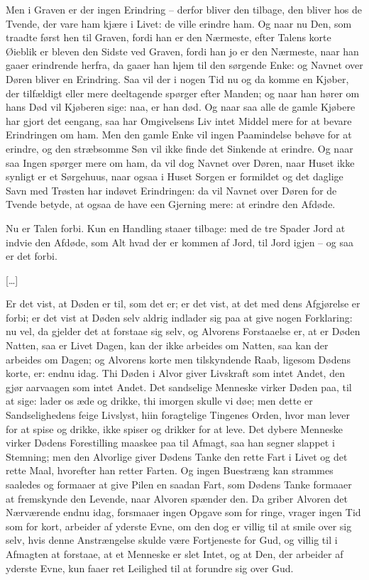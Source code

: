 \documentclass[12pt,a4paper]{article}
\begin{document}
Men i Graven er der ingen Erindring – derfor bliver den tilbage, den bliver hos de Tvende, der vare ham kjære i Livet: de ville erindre ham. Og naar nu Den, som traadte først hen til Graven, fordi han er den Nærmeste, efter Talens korte Øieblik er bleven den Sidste ved Graven, fordi han jo er den Nærmeste, naar han gaaer erindrende herfra, da gaaer han hjem til den sørgende Enke: og Navnet over Døren bliver en Erindring. Saa vil der i nogen Tid nu og da komme en Kjøber, der tilfældigt eller mere deeltagende spørger efter Manden; og naar han hører om hans Død vil Kjøberen sige: naa, er han død. Og naar saa alle de gamle Kjøbere har gjort det eengang, saa har Omgivelsens Liv intet Middel mere for at bevare Erindringen om ham. Men den gamle Enke vil ingen Paamindelse behøve for at erindre, og den stræbsomme Søn vil ikke finde det Sinkende at erindre. Og naar saa Ingen spørger mere om ham, da vil dog Navnet over Døren, naar Huset ikke synligt er et Sørgehuus, naar ogsaa i Huset Sorgen er formildet og det daglige Savn med Trøsten har indøvet Erindringen: da vil Navnet over Døren for de Tvende betyde, at ogsaa de have een Gjerning mere: at erindre den Afdøde.

Nu er Talen forbi. Kun en Handling staaer tilbage: med de tre Spader Jord at indvie den Afdøde, som Alt hvad der er kommen af Jord, til Jord igjen – og saa er det forbi.

[…]

Er det vist, at Døden er til, som det er; er det vist, at det med dens Afgjørelse er forbi; er det vist at Døden selv aldrig indlader sig paa at give nogen Forklaring: nu vel, da gjelder det at forstaae sig selv, og Alvorens Forstaaelse er, at er Døden Natten, saa er Livet Dagen, kan der ikke arbeides om Natten, saa kan der arbeides om Dagen; og Alvorens korte men tilskyndende Raab, ligesom Dødens korte, er: endnu idag. Thi Døden i Alvor giver Livskraft som intet Andet, den gjør aarvaagen som intet Andet. Det sandselige Menneske virker Døden paa, til at sige: lader os æde og drikke, thi imorgen skulle vi døe; men dette er Sandselighedens feige Livslyst, hiin foragtelige Tingenes Orden, hvor man lever for at spise og drikke, ikke spiser og drikker for at leve. Det dybere Menneske virker Dødens Forestilling maaskee paa til Afmagt, saa han segner slappet i Stemning; men den Alvorlige giver Dødens Tanke den rette Fart i Livet og det rette Maal, hvorefter han retter Farten. Og ingen Buestræng kan strammes saaledes og formaaer at give Pilen en saadan Fart, som Dødens Tanke formaaer at fremskynde den Levende, naar Alvoren spænder den. Da griber Alvoren det Nærværende endnu idag, forsmaaer ingen Opgave som for ringe, vrager ingen Tid som for kort, arbeider af yderste Evne, om den dog er villig til at smile over sig selv, hvis denne Anstrængelse skulde være Fortjeneste for Gud, og villig til i Afmagten at forstaae, at et Menneske er slet Intet, og at Den, der arbeider af yderste Evne, kun faaer ret Leilighed til at forundre sig over Gud.
\end{document}
